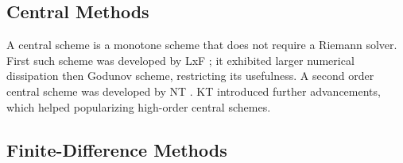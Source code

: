 

\subsection{Central Methods}

A central scheme is a monotone scheme that does not require a Riemann solver. 
%
First such scheme was developed by \ac{LxF} \citep{Lax:1954,Friedrichs:1954}; 
it exhibited larger numerical dissipation then Godunov scheme, restricting its usefulness.
A second order central scheme was developed by \ac{NT} \citep{Nessyahu:1990}.
\ac{KT} \citep{Kurganov:2000} introduced further advancements, which helped popularizing high-order central schemes. 

%


\subsection{Finite-Difference Methods}

